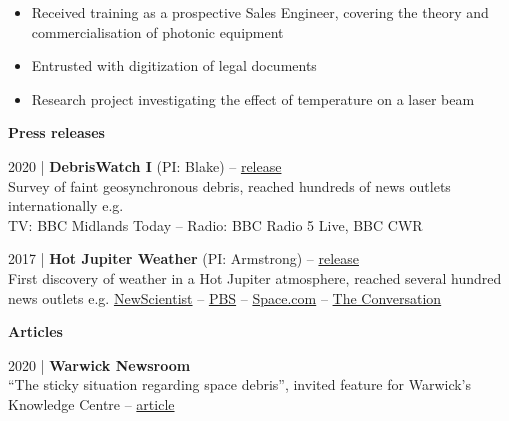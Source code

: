 \documentclass[10pt,a4paper]{altacv}
\begin{document}
\divider

\begin{itemize}
	\item Received training as a prospective Sales Engineer, covering the theory and commercialisation of photonic equipment
	\item Entrusted with digitization of legal documents 
	\item Research project investigating the effect of temperature on a laser beam
\end{itemize}

\medskip


\normalsize \textbf{Press releases}

\medskip

\small 2020 | \textbf{DebrisWatch I} (PI: Blake) -- \href{https://warwick.ac.uk/newsandevents/pressreleases/faint_orbital_debris/}{release} \\
Survey of faint geosynchronous debris, reached hundreds of news outlets internationally e.g. \\
TV: BBC Midlands Today -- Radio: BBC Radio 5 Live, BBC CWR 

\smallskip

\small 2017 | \textbf{Hot Jupiter Weather} (PI: Armstrong) -- \href{https://warwick.ac.uk/newsandevents/pressreleases/winds_of_rubies/}{release} \\
First discovery of weather in a Hot Jupiter atmosphere, reached several hundred news outlets e.g. \href{https://www.newscientist.com/article/2115792-first-exoplanet-weather-report-shows-clouds-of-ruby-and-sapphire/}{NewScientist} -- \href{https://www.pbs.org/newshour/science/heres-first-weather-report-exoplanet}{PBS} -- \href{https://www.space.com/34992-giant-alien-planet-ruby-clouds-weather.html}{Space.com} --
\href{https://theconversation.com/how-we-caught-the-first-glimpse-of-weather-on-a-faraway-gas-giant-70229}{The Conversation}

\divider

\normalsize \textbf{Articles}

\medskip

\small 2020 | \textbf{Warwick Newsroom} \\
``The sticky situation regarding space debris'', invited feature for Warwick's Knowledge Centre -- \href{https://warwick.ac.uk/newsandevents/knowledgecentre/science/physics-astrophysics/space_debris}{article}
\end{document}
